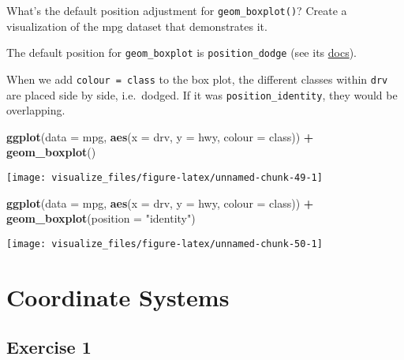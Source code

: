 \documentclass[]{book}
\newenvironment{Shaded}{\begin{snugshade}}{\end{snugshade}}
\newcommand{\DataTypeTok}[1]{\textcolor[rgb]{0.13,0.29,0.53}{#1}}
\newcommand{\KeywordTok}[1]{\textcolor[rgb]{0.13,0.29,0.53}{\textbf{#1}}}
\newcommand{\NormalTok}[1]{#1}
\newcommand{\OperatorTok}[1]{\textcolor[rgb]{0.81,0.36,0.00}{\textbf{#1}}}
\newcommand{\StringTok}[1]{\textcolor[rgb]{0.31,0.60,0.02}{#1}}
\theoremstyle{plain}
\theoremstyle{remark}
\theoremstyle{definition}
\theoremstyle{definition}
\theoremstyle{definition}
\theoremstyle{remark}
\begin{document}
What's the default position adjustment for \texttt{geom\_boxplot()}?
Create a visualization of the mpg dataset that demonstrates it.

The default position for \texttt{geom\_boxplot} is
\texttt{position\_dodge} (see its
\href{http://docs.ggplot2.org/current/geom_boxplot.html}{docs}).

When we add \texttt{colour\ =\ class} to the box plot, the different
classes within \texttt{drv} are placed side by side, i.e.~dodged. If it
was \texttt{position\_identity}, they would be overlapping.

\begin{Shaded}
\begin{Highlighting}[]
\KeywordTok{ggplot}\NormalTok{(}\DataTypeTok{data =}\NormalTok{ mpg, }\KeywordTok{aes}\NormalTok{(}\DataTypeTok{x =}\NormalTok{ drv, }\DataTypeTok{y =}\NormalTok{ hwy, }\DataTypeTok{colour =}\NormalTok{ class)) }\OperatorTok{+}
\StringTok{  }\KeywordTok{geom_boxplot}\NormalTok{()}
\end{Highlighting}
\end{Shaded}

\begin{center}\texttt{[image: visualize\_files/figure-latex/unnamed-chunk-49-1]} \end{center}

\begin{Shaded}
\begin{Highlighting}[]
\KeywordTok{ggplot}\NormalTok{(}\DataTypeTok{data =}\NormalTok{ mpg, }\KeywordTok{aes}\NormalTok{(}\DataTypeTok{x =}\NormalTok{ drv, }\DataTypeTok{y =}\NormalTok{ hwy, }\DataTypeTok{colour =}\NormalTok{ class)) }\OperatorTok{+}
\StringTok{  }\KeywordTok{geom_boxplot}\NormalTok{(}\DataTypeTok{position =} \StringTok{"identity"}\NormalTok{)}
\end{Highlighting}
\end{Shaded}

\begin{center}\texttt{[image: visualize\_files/figure-latex/unnamed-chunk-50-1]} \end{center}

\hypertarget{coordinate-systems}{%
\section{Coordinate Systems}\label{coordinate-systems}}

\hypertarget{exercise-1-4}{%
\subsection{Exercise 1}\label{exercise-1-4}}
\end{document}
